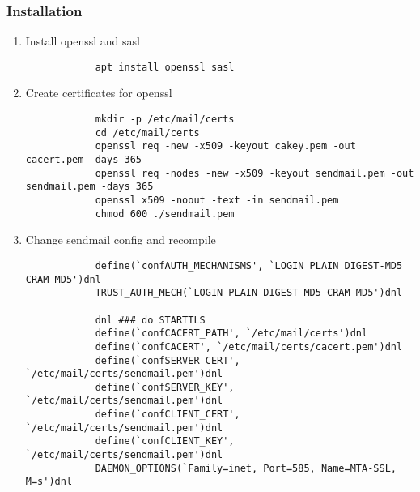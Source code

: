 \documentclass[10pt]{article}
\begin{document}
    \subsubsection{Installation}
    \begin{enumerate}
        \item Install openssl and sasl
        \begin{verbatim}
            apt install openssl sasl
        \end{verbatim}
        \item Create certificates for openssl
        \begin{verbatim}
            mkdir -p /etc/mail/certs
            cd /etc/mail/certs
            openssl req -new -x509 -keyout cakey.pem -out cacert.pem -days 365
            openssl req -nodes -new -x509 -keyout sendmail.pem -out sendmail.pem -days 365
            openssl x509 -noout -text -in sendmail.pem
            chmod 600 ./sendmail.pem
        \end{verbatim}
        \item Change sendmail config and recompile
        \begin{verbatim}
            define(`confAUTH_MECHANISMS', `LOGIN PLAIN DIGEST-MD5 CRAM-MD5')dnl
            TRUST_AUTH_MECH(`LOGIN PLAIN DIGEST-MD5 CRAM-MD5')dnl

            dnl ### do STARTTLS
            define(`confCACERT_PATH', `/etc/mail/certs')dnl
            define(`confCACERT', `/etc/mail/certs/cacert.pem')dnl
            define(`confSERVER_CERT', `/etc/mail/certs/sendmail.pem')dnl
            define(`confSERVER_KEY', `/etc/mail/certs/sendmail.pem')dnl
            define(`confCLIENT_CERT', `/etc/mail/certs/sendmail.pem')dnl
            define(`confCLIENT_KEY', `/etc/mail/certs/sendmail.pem')dnl
            DAEMON_OPTIONS(`Family=inet, Port=585, Name=MTA-SSL, M=s')dnl
        \end{verbatim}
    \end{enumerate}
\end{document}

